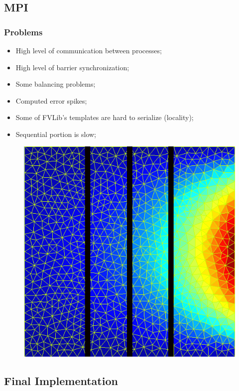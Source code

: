 \documentclass{beamer}
\begin{document}
\subsection{MPI} 

\begin{frame}
	\frametitle{Problems}
	\begin{itemize}		
		\item High level of communication between processes;
		\item High level of barrier synchronization;
		\item Some balancing problems;
		\item Computed error spikes;
		\item Some of FVLib's templates are hard to serialize (locality);
		\item Sequential portion is slow;
	\end{itemize}		
\end{frame}




\begin{frame}
	\begin{figure}[!htp]
    	\centering   
        \includegraphics[width=.6\textwidth]{../images/mesh_vertical.png}        
	\end{figure}
\end{frame}




\subsection{Final Implementation}
\end{document}
